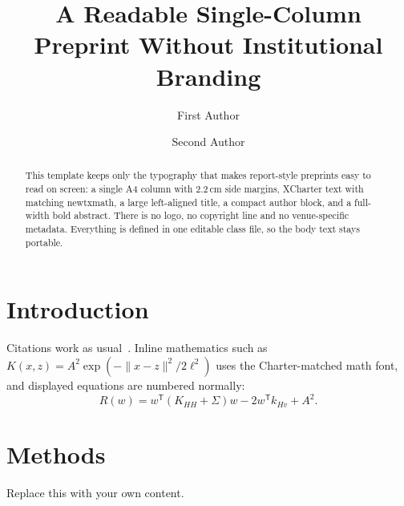 \documentclass[11pt,a4paper,lineno]{cleanpreprint}
\title{A Readable Single-Column Preprint Without Institutional Branding}
\author[1]{First Author}
\author[2]{Second Author}
\affil[1]{Your Institute}
\affil[2]{Another Institute}
\begin{document}
\maketitle

\begin{abstract}
This template keeps only the typography that makes report-style preprints
easy to read on screen: a single A4 column with 2.2\,cm side margins,
XCharter text with matching newtxmath, a large left-aligned title, a compact
author block, and a full-width bold abstract. There is no logo, no copyright
line and no venue-specific metadata. Everything is defined in one editable
class file, so the body text stays portable.
\end{abstract}

\section{Introduction}
Citations work as usual~\cite{placeholder}. Inline mathematics such as
$K(x,z) = A^2\exp(-\lVert x-z\rVert^2/2\ell^2)$ uses the Charter-matched
math font, and displayed equations are numbered normally:
\begin{equation}
  R(w) = w^{\mathsf T}(K_{HH}+\Sigma)w - 2w^{\mathsf T}k_{Hv} + A^2 .
\end{equation}

\section{Methods}
Replace this with your own content.



%   
\end{document}
